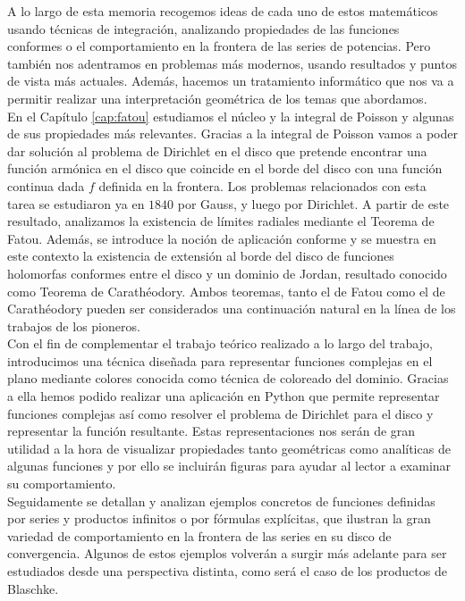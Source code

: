A lo largo de esta memoria recogemos ideas de cada uno de estos matemáticos usando técnicas de integración, analizando propiedades de las funciones conformes o el comportamiento en la frontera de las series de potencias. Pero también nos adentramos en problemas más modernos, usando resultados y puntos de vista más actuales. Además, hacemos un tratamiento informático que nos va a permitir realizar una interpretación geométrica de los temas que abordamos. \\

En el Capítulo \ref{cap:fatou} estudiamos el núcleo y la integral de Poisson y algunas de sus propiedades más relevantes. Gracias a la integral de Poisson vamos a poder dar solución al problema de Dirichlet en el disco que pretende encontrar una función armónica en el disco que coincide en el borde del disco con una función continua dada $f$ definida en la frontera. Los problemas relacionados con esta tarea se estudiaron ya en $1840$ por Gauss, y luego por Dirichlet.
A partir de este resultado, analizamos la existencia de límites radiales mediante el Teorema de Fatou. Además, se introduce la noción de aplicación conforme y se muestra en este contexto la existencia de extensión al borde del disco de funciones holomorfas conformes entre el disco y un dominio de Jordan, resultado conocido como Teorema de Carathéodory. Ambos teoremas, tanto el de Fatou como el de Carathéodory pueden ser considerados una continuación natural en la línea de los trabajos de los pioneros. \\

Con el fin de complementar el trabajo teórico realizado a lo largo del trabajo, introducimos una técnica diseñada para representar funciones complejas en el plano mediante colores conocida como técnica de coloreado del dominio. Gracias a ella hemos podido realizar una aplicación en Python que permite representar funciones complejas así como resolver el problema de Dirichlet para el disco y representar la función resultante. Estas representaciones nos serán de gran utilidad a la hora de visualizar propiedades tanto geométricas como analíticas de algunas funciones y por ello se incluirán figuras para ayudar al lector a examinar su comportamiento. \\

Seguidamente se detallan y analizan ejemplos concretos de funciones definidas por series y productos infinitos o por fórmulas explícitas, que ilustran la gran variedad de comportamiento en la frontera de las series en su disco de convergencia. Algunos de estos ejemplos volverán a surgir más adelante para ser estudiados desde una perspectiva distinta, como será el caso de los productos de Blaschke. \\

